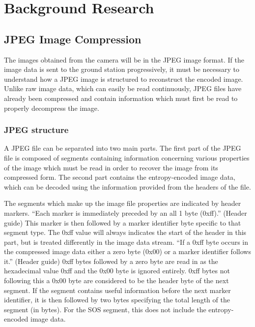 \chapter{Background Research}



\section{JPEG Image Compression}
The images obtained from the camera will be in the JPEG image format. If the image data is sent to the ground station progressively, it must be necessary to understand how a JPEG image is structured to reconstruct the encoded image. Unlike raw image data, which can easily be read continuously, JPEG files have already been compressed and contain information which must first be read to properly decompress the image.

\subsection{JPEG structure}
A JPEG file can be separated into two main parts. The first part of the JPEG file is composed of segments containing information concerning various properties of the image which must be read in order to recover the image from its compressed form. The second part contains the entropy-encoded image data, which can be decoded using the information provided from the headers of the file.  

The segments which make up the image file properties are indicated by header markers. ``Each marker is immediately preceded by an all 1 byte (0xff).'' (Header guide) This marker is then followed by a marker identifier byte specific to that segment type. The 0xff value will always indicates the start of the header in this part, but is treated differently in the image data stream. ``If a 0xff byte occurs in the compressed image data either a zero byte (0x00) or a marker identifier follows it.'' (Header guide) 0xff bytes followed by a zero byte are read in as the hexadecimal value 0xff and the 0x00 byte is ignored entirely. 0xff bytes not following this a 0x00 byte are considered to be the header byte of the next segment. If the segment contains useful information before the next marker identifier, it is then followed by two bytes specifying the total length of the segment (in bytes). For the SOS segment, this does not include the entropy-encoded image data.


